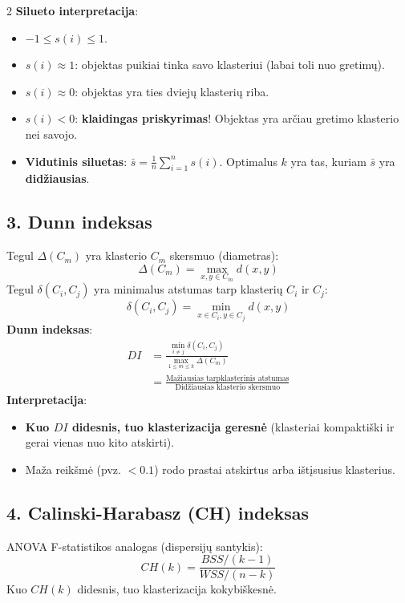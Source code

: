 \documentclass[9pt,a4paper]{article}
\begin{document}
\begin{multicols*}{2}
\textbf{Silueto interpretacija}:
\begin{itemize}
    \item $-1 \le s(i) \le 1$.
    \item $s(i) \approx 1$: objektas puikiai tinka savo klasteriui (labai toli nuo gretimų).
    \item $s(i) \approx 0$: objektas yra ties dviejų klasterių riba.
    \item $s(i) < 0$: \textbf{klaidingas priskyrimas}! Objektas yra arčiau gretimo klasterio nei savojo.
    \item \textbf{Vidutinis siluetas}: $\bar{s} = \frac{1}{n}\sum_{i=1}^n s(i)$. Optimalus $k$ yra tas, kuriam $\bar{s}$ yra \textbf{didžiausias}.
\end{itemize}

\subsection{3. Dunn indeksas}
Tegul $\Delta(C_m)$ yra klasterio $C_m$ skersmuo (diametras):
\begin{equation*}
    \Delta(C_m) = \max_{x, y \in C_m} d(x, y)
\end{equation*}
Tegul $\delta(C_i, C_j)$ yra minimalus atstumas tarp klasterių $C_i$ ir $C_j$:
\begin{equation*}
    \delta(C_i, C_j) = \min_{x \in C_i, y \in C_j} d(x, y)
\end{equation*}
\textbf{Dunn indeksas}:
\begin{align*}
    DI &= \frac{\min_{i \ne j} \delta(C_i, C_j)}{\max_{1 \le m \le k} \Delta(C_m)} \\
    &= \frac{\text{Mažiausias tarpklasterinis atstumas}}{\text{Didžiausias klasterio skersmuo}}
\end{align*}
\textbf{Interpretacija}:
\begin{itemize}
    \item \textbf{Kuo $DI$ didesnis, tuo klasterizacija geresnė} (klasteriai kompaktiški ir gerai vienas nuo kito atskirti).
    \item Maža reikšmė (pvz. $<0.1$) rodo prastai atskirtus arba ištįsusius klasterius.
\end{itemize}

\subsection{4. Calinski-Harabasz (CH) indeksas}
ANOVA F-statistikos analogas (dispersijų santykis):
\begin{equation*}
    CH(k) = \frac{BSS / (k - 1)}{WSS / (n - k)}
\end{equation*}
Kuo $CH(k)$ didesnis, tuo klasterizacija kokybiškesnė.


\end{multicols*}
\end{document}

